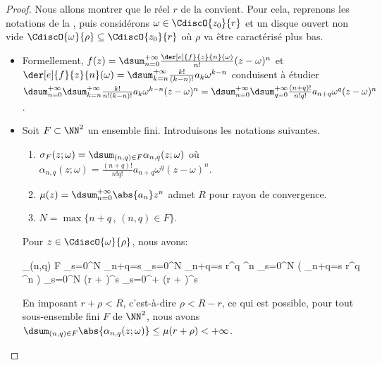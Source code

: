 \begin{proof}
	Nous allons montrer que le réel $r$ de la  convient.
	Pour cela, reprenons les notations de la ,
	puis
	considérons $\omega \in \CdiscO{z_0}{r}$
    et
    un disque ouvert non vide $\CdiscO{\omega}{\rho} \subseteq \CdiscO{z_0}{r}$ où $\rho$ va être caractérisé plus bas.
	\begin{itemize}
		\item Formellement,
		$f(z) = \dsum_{n = 0}^{+\infty} \frac{\der[e]{f}{z}{n}(\omega)}{n!} (z - \omega)^n$
		et
		$\der[e]{f}{z}{n}(\omega) = \dsum_{k = n}^{+\infty} \frac{k!}{(k-n)!} a_k \omega^{k - n}$
		conduisent à étudier
		$ \dsum_{n = 0}^{+\infty} \dsum_{k = n}^{+\infty} \frac{k!}{n! (k-n)!} a_k \omega^{k - n} (z - \omega)^n
		= \dsum_{n = 0}^{+\infty} \dsum_{q = 0}^{+\infty} \frac{(n+q)!}{n! q!} a_{n+q} \omega^q (z - \omega)^n$.
	

		\item Soit $F \subset \NN^2$ un ensemble fini.
		Introduisons les notations suivantes.
		\begin{enumerate}
			\item $\sigma_F(z ; \omega) = \dsum_{(n,q) \in F} \alpha_{n,q}(z ; \omega)$
			où
			$\alpha_{n,q}(z ; \omega) = \frac{(n+q)!}{n! q!} a_{n+q} \omega^q (z - \omega)^n$.

			\vspace{-7pt}
			\item $\mu(z) = \dsum_{n = 0}^{+\infty} \abs{a_n} z^n$ admet $R$ pour rayon de convergence.

			\item $N = \max \big\{ n + q \,,\, (n,q) \in F \big\}$.
		\end{enumerate}
		
		\noindent
		Pour $z \in \CdiscO{\omega}{\rho}$, nous avons:
		
		\noindent\kern-6pt
		\begin{stepcalc}[style=sar, ope=\leq]
			\dsum_{(n,q) \in F} 
		\explnext{}
			\dsum_{s=0}^{N} \dsum_{n+q=s} 
		\explnext{}
			\dsum_{s=0}^{N} \dsum_{n+q=s}   r^q \rho^n
		\explnext{}
			\dsum_{s=0}^{N}  \big( \dsum_{n+q=s}  r^q \rho^n \big)
		\explnext{}
			\dsum_{s=0}^{N}  (r + \rho)^s
		\explnext{}
			\dsum_{s=0}^{+\infty}  (r + \rho)^s
		\end{stepcalc}
		
		\noindent
		En imposant $r + \rho < R$, c'est-à-dire $\rho < R - r$, ce qui est possible, 
		pour tout sous-ensemble fini $F$ de $\NN^2$, nous avons
		$\dsum_{(n,q) \in F} \abs{\alpha_{n,q}(z ; \omega)} \leq \mu(r + \rho) < +\infty$.
		

\end{itemize}
\end{proof}

